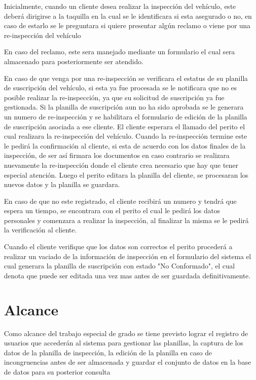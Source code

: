 \newpage
\setlength{\parskip}{5mm}
Inicialmente, cuando un cliente desea realizar la inspección del vehículo, este deberá dirigirse a la taquilla en la cual se le identificara si esta asegurado o no, en caso de estarlo se le preguntara si quiere presentar algún reclamo o viene por una re-inspección del vehículo

En caso del reclamo, este sera manejado mediante un formulario el cual sera almacenado para posteriormente ser atendido.

En caso de que venga por una re-inspección se verificara el estatus de su planilla de suscripción del vehículo, si esta ya fue procesada se le notificara que no es posible realizar la re-inspección, ya que su solicitud de suscripción ya fue gestionada. Si la planilla de suscripción aun no ha sido aprobada se le generara un numero de re-inspección y se habilitara el formulario de edición de la planilla de suscripción asociada a ese cliente. El cliente esperara el llamado del perito el cual realizara la re-inspección del vehículo. Cuando la re-inspección termine este le pedirá la confirmación al cliente, si esta de acuerdo con los datos finales de la inspección, de ser así firmara los documentos en caso contrario se realizara nuevamente la re-inspección donde el cliente crea necesario que hay que tener especial atención. Luego el perito editara la planilla del cliente, se procesaran los nuevos datos y la planilla se guardara.

En caso de que no este registrado, el cliente recibirá un numero y tendrá que espera un tiempo, se encontrara con el perito el cual le pedirá los datos personales y comenzara a realizar la inspección, al finalizar la misma se le pedirá la verificación al cliente.

Cuando el cliente verifique que los datos son correctos el perito procederá a realizar un vaciado de la información de inspección en el formulario del sistema el cual generara la planilla de suscripción con estado "No Conformado", el cual denota que puede ser editada una vez mas antes de ser guardada definitivamente.
\setlength{\parskip}{0mm}


\newpage
\section{Alcance}

Como alcance del trabajo especial de grado se tiene previsto lograr el registro de usuarios que accederán al sistema para gestionar las planillas, la captura de los datos de la planilla de inspección, la edición de la planilla en caso de incongruencias antes de ser almacenada y guardar el conjunto de datos en la base de datos para su posterior consulta


